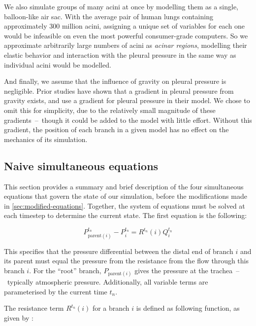 We also simulate groups of many acini at once by modelling them as a single, balloon-like air sac.
With the average pair of human lungs containing approximately 300 million acini, assigning a unique
set of variables for each one would be infeasible on even the most powerful consumer-grade
computers. So we approximate arbitrarily large numbers of acini as \textit{acinar regions},
modelling their elastic behavior and interaction with the pleural pressure in the same way as
individual acini would be modelled.

And finally, we assume that the influence of gravity on pleural pressure is negligible. Prior
studies have shown that a gradient in pleural pressure from gravity exists, and \cite{FoyEtAl2017}
use a gradient for pleural pressure in their model. We chose to omit this for simplicity, due to the
relatively small magnitude of these gradients\footnotemark~--~though it could be added to the model
with little effort. Without this gradient, the position of each branch in a given model has no
effect on the mechanics of its simulation.


\subsection{Naive simultaneous equations} \label{sec:simultaneous-equations}

This section provides a summary and brief description of the four simultaneous equations that govern
the state of our simulation, before the modifications made in \autoref{sec:modified-equations}.
Together, the system of equations must be solved at each timestep to determine the current state.
The first equation is the following:

\begin{equation}
    P_{\text{parent}(i)}^{t_n} - P_i^{t_n} = R^{t_n}(i) Q_i^{t_n}
\end{equation}

\noindent
This specifies that the pressure differential between the distal end of branch $i$ and its parent
must equal the pressure from the resistance from the flow through this branch $i$. For the ``root''
branch, $P_{\text{parent}(i)}$ gives the pressure at the trachea~--~typically atmospheric pressure.
Additionally, all variable terms are parameterised by the current time $t_n$.

The resistance term $R^{t_n}(i)$ for a branch $i$ is defined as following function, as given by
\cite{PedleyEtAl1970b}:

